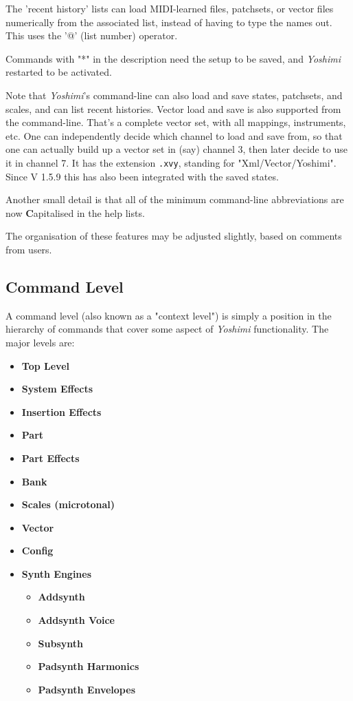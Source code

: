    The 'recent history' lists can load MIDI-learned files, patchsets, or
   vector files numerically from the associated list, instead of having to
   type the names out.
   This uses the '@' (list number) operator.

   Commands with "*" in the description need the setup to be saved, and
   \textsl{Yoshimi} restarted to be activated.

   Note that \textsl{Yoshimi}'s command-line can also load and save states,
   patchsets, and scales, and can list recent histories. Vector load and save
   is also supported from the command-line. That's a complete vector set,
   with all mappings, instruments, etc.
   One can independently decide which channel to load and save from, so that
   one can actually build up a vector set in (say) channel 3, then later
   decide to use it in channel 7. It has the extension \texttt{.xvy},
   standing for "Xml/Vector/Yoshimi".
   Since V 1.5.9 this has also been integrated with the saved states.

   Another small detail is that all of the minimum command-line abbreviations
   are now \textbf{C}apitalised in the help lists.

   The organisation of these features may be adjusted slightly, based on
   comments from users.

\subsection{Command Level}
\label{subsec:command_line_command_level}

   A command level (also known as a "context level")
   is simply a position in the hierarchy of commands that cover
   some aspect of \textsl{Yoshimi} functionality.
   The major levels are:

   \begin{itemize}
      \item \textbf{Top Level}
      \item \textbf{System Effects}
      \item \textbf{Insertion Effects}
      \item \textbf{Part}
      \item \textbf{Part Effects}
      \item \textbf{Bank}
      \item \textbf{Scales (microtonal)}
      \item \textbf{Vector}
      \item \textbf{Config}
      \item \textbf{Synth Engines}
      \begin{itemize}
         \item \textbf{Addsynth}
         \item \textbf{Addsynth Voice}
         \item \textbf{Subsynth}
         \item \textbf{Padsynth Harmonics}
         \item \textbf{Padsynth Envelopes}
      \end{itemize}
   \end{itemize}

